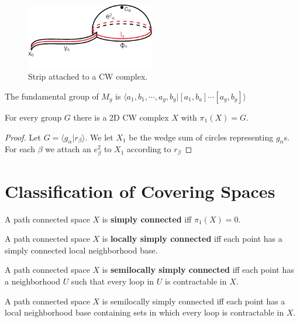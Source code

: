 \documentclass[12pt]{book}
\begin{document}
\begin{figure}[htb!]
	\centering  
	\includegraphics[width=0.5\textwidth ]{resources/chap_fund_grp/cw_group.pdf}  
	\caption{Strip attached to a CW complex.}
	\label{fig:cw_group}
\end{figure}

\begin{lemma}
	The fundamental group of $M_g$ is $\langle a_1,b_1,\cdots,a_g,b_g |[a_1,b_a]\cdots[a_g,b_g]\rangle$
\end{lemma}

\begin{lemma}
	For every group $G$ there is a 2D CW complex $X$ with $\pi_1(X)=G$. \label{lem:space_grp}
\end{lemma}
\begin{proof}
	Let $G=\langle g_\alpha|r_\beta\rangle$. We let $X_1$ be the wedge sum of circles representing $g_\alpha$s. For each $\beta$ we attach an $e_\beta^2$ to $X_1$ according to $r_\beta$
\end{proof}

\section{Classification of Covering Spaces}

\begin{definition}
	A path connected space $X$ is {\bf simply connected} iff $\pi_1(X)=0$.
\end{definition}

\begin{definition}
	A path connected space $X$ is {\bf locally simply connected} iff each point has a simply connected local neighborhood base.
\end{definition}

\begin{definition}
	A path connected space $X$ is {\bf semilocally simply connected} iff each point has a neighborhood $U$ such that every loop in $U$ is contractable in $X$.
\end{definition}

\begin{lemma}
	A path connected space $X$ is semilocally simply connected iff each point has a local neighborhood base containing sets in which every loop is contractable in $X$.
\end{lemma}
\end{document}
